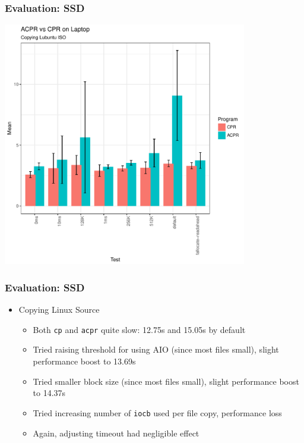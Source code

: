 \documentclass{beamer}
\begin{document}
\begin{frame}
    \frametitle{Evaluation: SSD}
    \centering
    \includegraphics[width=0.8\textwidth,height=0.8\textheight,]{Laptop_Lubuntu_Barplot.pdf}
\end{frame}

\begin{frame}
    \frametitle{Evaluation: SSD}
    \begin{itemize}
	\item{Copying Linux Source}
	    \begin{itemize}
		\item Both \texttt{cp} and \texttt{acpr} quite slow: 12.75s and 15.05s by default
		\item Tried raising threshold for using AIO (since most files small), slight performance boost to 13.69s
		\item Tried smaller block size (since most files small), slight performance boost to 14.37s
		\item Tried increasing number of \texttt{iocb} used per file copy, performance loss
		\item Again, adjusting timeout had negligible effect
	    \end{itemize}
    \end{itemize}
\end{frame}
\end{document}
